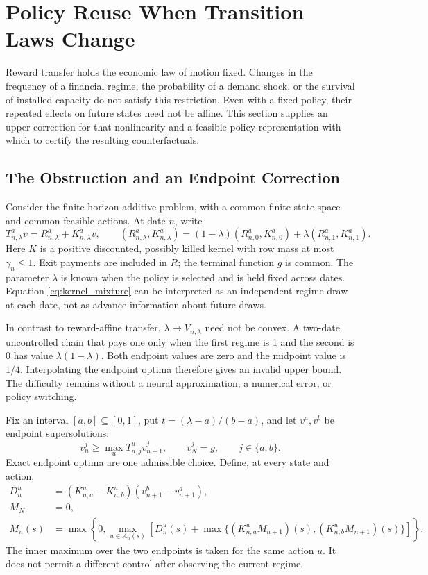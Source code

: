 \section{Policy Reuse When Transition Laws Change}
\label{sec:kernel_transfer}
Reward transfer holds the economic law of motion fixed. Changes in the frequency of a financial regime, the probability of a demand shock, or the survival of installed capacity do not satisfy this restriction. Even with a fixed policy, their repeated effects on future states need not be affine. This section supplies an upper correction for that nonlinearity and a feasible-policy representation with which to certify the resulting counterfactuals.

\subsection{The Obstruction and an Endpoint Correction}
Consider the finite-horizon additive problem, with a common finite state space and common feasible actions. At date $n$, write
\begin{equation}
 T_{n,\lambda}^a v=R_{n,\lambda}^a+K_{n,\lambda}^a v,
 \qquad (R_{n,\lambda}^a,K_{n,\lambda}^a)
 =(1-\lambda)(R_{n,0}^a,K_{n,0}^a)+\lambda(R_{n,1}^a,K_{n,1}^a).
 \label{eq:kernel_mixture}
\end{equation}
Here $K$ is a positive discounted, possibly killed kernel with row mass at most $\gamma_n\leq1$. Exit payments are included in $R$; the terminal function $g$ is common. The parameter $\lambda$ is known when the policy is selected and is held fixed across dates. Equation \eqref{eq:kernel_mixture} can be interpreted as an independent regime draw at each date, not as advance information about future draws.

In contrast to reward-affine transfer, $\lambda\mapsto V_{n,\lambda}$ need not be convex. A two-date uncontrolled chain that pays one only when the first regime is 1 and the second is 0 has value $\lambda(1-\lambda)$. Both endpoint values are zero and the midpoint value is $1/4$. Interpolating the endpoint optima therefore gives an invalid upper bound. The difficulty remains without a neural approximation, a numerical error, or policy switching.

Fix an interval $[a,b]\subseteq[0,1]$, put $t=(\lambda-a)/(b-a)$, and let $v^a,v^b$ be endpoint supersolutions:
\begin{equation}
 v_n^j\geq\max_u T_{n,j}^u v_{n+1}^j,\qquad
 v_N^j=g,\qquad j\in\{a,b\}.
 \label{eq:endpoint_supersolutions}
\end{equation}
Exact endpoint optima are one admissible choice. Define, at every state and action,
\begin{align}
 D_n^u&=(K_{n,a}^u-K_{n,b}^u)(v_{n+1}^b-v_{n+1}^a),\\
 M_N&=0,\\
 M_n(s)&=\max\left\{0,\max_{u\in A_n(s)}
 \left[D_n^u(s)+\max\{(K_{n,a}^uM_{n+1})(s),(K_{n,b}^uM_{n+1})(s)\}\right]\right\}.
 \label{eq:kernel_correction}
\end{align}
The inner maximum over the two endpoints is taken for the same action $u$. It does not permit a different control after observing the current regime.

